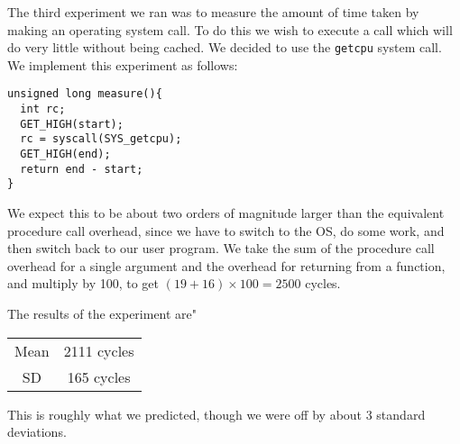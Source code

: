 The third experiment we ran was to measure the amount of time taken by making an operating system call.
To do this we wish to execute a call which will do very little without being cached.  
We decided to use the {\tt getcpu} system call.
\newline
\newline
We implement this experiment as follows: 
\begin{verbatim}
unsigned long measure(){
  int rc;
  GET_HIGH(start);
  rc = syscall(SYS_getcpu);
  GET_HIGH(end);
  return end - start;
}
\end{verbatim}

We expect this to be about two orders of magnitude larger than the equivalent procedure call overhead, since we have to switch to the OS, do some work, and then switch back to our user program.  We take the sum of the procedure call overhead for a single argument and the overhead for returning from a function, and multiply by 100, to get $(19+16) \times 100 = 2500$ cycles.

The results of the experiment are"

\begin{table}[h]
\centering
\begin{tabular}{|c|c|}\hline
Mean & 2111 cycles \\
SD & 165 cycles\\\hline
\end{tabular}
\end{table}

This is roughly what we predicted, though we were off by about 3 standard deviations.